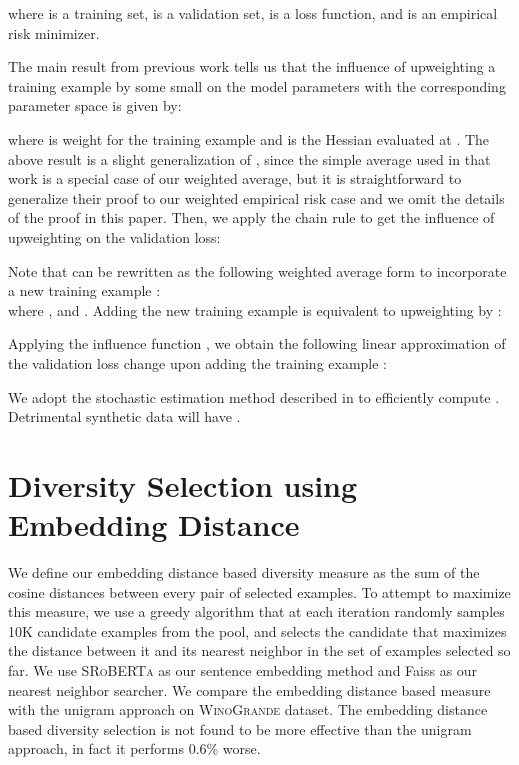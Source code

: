 \documentclass[11pt,a4paper]{article}
\newcommand{\winogrande}{\textsc{WinoGrande}\xspace}
\newcommand{\roberta}{\textsc{RoBERTa}\xspace}
\begin{document}
where  is a training set,   is a validation set,  is a loss function, and  is an empirical risk minimizer. 


The main result from previous work \citep{Atkinson1983ResidualsAI,Koh2017UnderstandingBP} tells us that the influence of upweighting a training example  by some small  on the model parameters  with the corresponding parameter space  is given by:

where  is weight for the training example  and  is the Hessian evaluated at . The above result is a slight generalization of \citet{Koh2017UnderstandingBP}, since the simple average used in that work is a special case of our weighted average, but it is straightforward to generalize their proof to our weighted empirical risk case and we omit the details of the proof in this paper. Then, we apply the chain rule to get the influence of upweighting  on the validation loss:

Note that  can be rewritten as the following weighted average form to incorporate a new training example :\\

 where ,  and . 
Adding the new training example  is equivalent to upweighting  by :



Applying the influence function , we obtain the following linear approximation of the validation loss change upon adding the training example :

We adopt the stochastic estimation method described in \citet{Koh2017UnderstandingBP} to efficiently compute . Detrimental synthetic data will have . 




\section{Diversity Selection using Embedding Distance}
\label{app:emb}
We define our embedding distance based diversity measure as the sum of the cosine distances between every pair of selected examples. To attempt to maximize this measure, we use a greedy algorithm that at each iteration randomly samples 10K candidate examples from the pool, and selects the candidate that maximizes the distance between it and its nearest neighbor in the set of examples selected so far. We use S\roberta \cite{Reimers2019SentenceBERTSE} as our sentence embedding method and Faiss \cite{JDH17} as our nearest neighbor searcher. We compare the embedding distance based measure with the unigram approach on \winogrande dataset. The embedding distance based diversity selection is not found to be more effective than the unigram approach, in fact it performs 0.6\% worse. 
\end{document}
